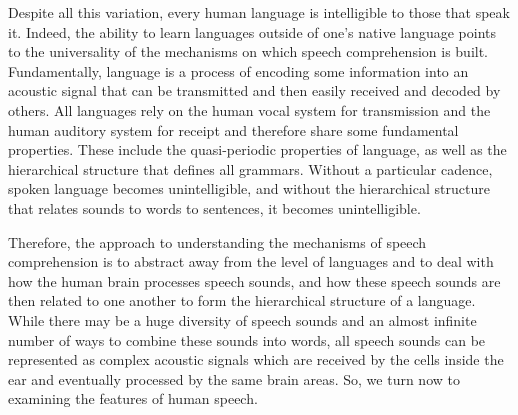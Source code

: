 \documentclass[titlepage]{article}
\begin{document}
  Despite all this variation, every human language is intelligible to those that speak it.
  Indeed, the ability to learn languages outside of one's native language points to the
  universality of the mechanisms on which speech comprehension is built. Fundamentally,
  language is a process of encoding some information into an acoustic signal that can
  be transmitted and then easily received and decoded by others. All languages rely on
  the human vocal system for transmission and the human auditory system for receipt
  and therefore share some fundamental properties. These include the quasi-periodic
  properties of language, as well as the hierarchical structure that defines all
  grammars. Without a particular cadence, spoken language becomes unintelligible,
  and without the hierarchical structure that relates sounds to words to sentences,
  it becomes unintelligible.

  Therefore, the approach to understanding the mechanisms of speech comprehension
  is to abstract away from the level of languages and to deal with how the human
  brain processes speech sounds, and how these speech sounds are then related to one
  another to form the hierarchical structure of a language.
  While there may be a huge diversity of speech sounds and an almost infinite number of ways
  to combine these sounds into words, all speech sounds can be represented as
  complex acoustic signals which are received by the cells inside the ear
  and eventually processed by the same brain areas. So, we turn now to examining the
  features of human speech.
\end{document}
